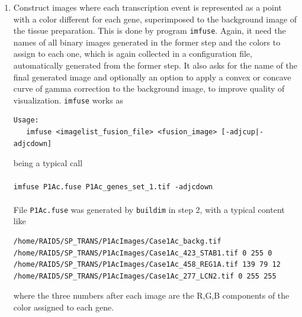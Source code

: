 \documentclass[11pt]{report}
\begin{document}
\begin{enumerate}
\begin{itemize}
This is the information used to build and analyze a marked point process using the R package {\tt spatstat}, as it will be explained in Supplementary
material-II.
\item A set of binary images, one for each interesting gene, with the same size of the focus area, that will be colored and superimposed to visualize
the spatial distribution
\item A groovy script to extract the background image from the original, big histopathological image.
\item A .csv file with a table of the requested genes and the number of transcription events for each one in the focus area.
\end{itemize}
This is done by program {\tt buildim}. Since the number of parameters needed is high and complex, they are not passed in the command line but collected
in a configuration file in the form\\
{\tt 'Key: value'}\\
The name of this configuration file is the only argument to the program.\\
{\tt buildim} works simply as
\begin{verbatim}
$ buildim
Usage:
   buildim <task_desc_file>
\end{verbatim}
being a typical call
\ \\
\verb|buildim P1Ac.desc|
\ \\
The keys and valid values for the configuration file, together with an example, will be explained later.
\item Construct images where each transcription event is represented as a point with a color different for each gene, superimposed to the background
image of the tissue preparation. This is done by program {\tt imfuse}. Again, it need the names of all binary images generated in the former step
and the colors to assign to each one, which is again collected in a configuration file, automatically generated from the former step. It also asks
for the name of the final generated image and optionally an option to apply a convex
or concave curve of gamma correction to the background image, to improve quality of
visualization. {\tt imfuse} works as
\begin{verbatim}
Usage:
   imfuse <imagelist_fusion_file> <fusion_image> [-adjcup|-adjcdown]
\end{verbatim}
being a typical call\\
\ \\
\verb|imfuse P1Ac.fuse P1Ac_genes_set_1.tif -adjcdown|\\
\ \\
File {\tt P1Ac.fuse} was generated by {\tt buildim} in step 2, with a typical
content like
\begin{verbatim}
/home/RAID5/SP_TRANS/P1AcImages/Case1Ac_backg.tif
/home/RAID5/SP_TRANS/P1AcImages/Case1Ac_423_STAB1.tif 0 255 0
/home/RAID5/SP_TRANS/P1AcImages/Case1Ac_458_REG1A.tif 139 79 12
/home/RAID5/SP_TRANS/P1AcImages/Case1Ac_277_LCN2.tif 0 255 255
\end{verbatim}
where the three numbers after each image are the R,G,B components of the color assigned to each gene.


\end{enumerate}
\end{document}
